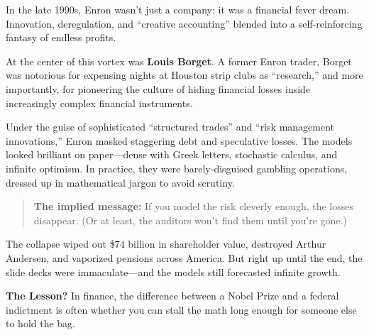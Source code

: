 \begin{tcolorbox}[colback=blue!5!white, colframe=blue!50!black,
  title={Historical Sidebar: Louis Borget and the Enron Math Illusion}]

In the late 1990s, Enron wasn’t just a company: it was a financial fever dream.  Innovation, deregulation, and ``creative accounting'' blended into a self-reinforcing fantasy of endless profits.

\medskip

At the center of this vortex was \textbf{Louis Borget}.  A former Enron trader, Borget was notorious for expensing nights at Houston strip clubs as ``research,'' and more importantly, for pioneering the culture of hiding financial losses inside increasingly complex financial instruments.

\medskip

Under the guise of sophisticated ``structured trades'' and ``risk management innovations,'' Enron masked staggering debt and speculative losses.  The models looked brilliant on paper—dense with Greek letters, stochastic calculus, and infinite optimism.  In practice, they were barely-disguised gambling operations, dressed up in mathematical jargon to avoid scrutiny.

\medskip

\begin{quote}
\textbf{The implied message:} If you model the risk cleverly enough, the losses disappear. (Or at least, the auditors won’t find them until you’re gone.)
\end{quote}

\medskip

The collapse wiped out \$74 billion in shareholder value, destroyed Arthur Andersen, and vaporized pensions across America.  But right up until the end, the slide decks were immaculate—and the models still forecasted infinite growth.

\medskip

\textbf{The Lesson?} In finance, the difference between a Nobel Prize and a federal indictment is often whether you can stall the math long enough for someone else to hold the bag.

\end{tcolorbox}
